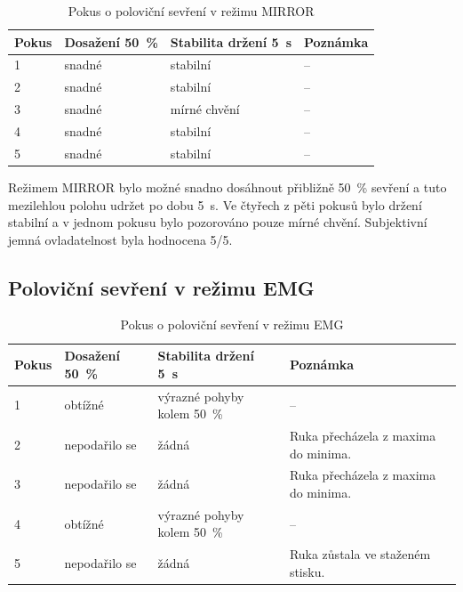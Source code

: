 \documentclass[FZS,DP]{tulthesis}
\begin{document}
\begin{table}[H]
\centering
\caption{Pokus o poloviční sevření v režimu MIRROR}
\label{tab:mirror-polovicni-sevreni}
\setlength{\tabcolsep}{2pt}
\begin{tabular}{|p{}|p{}|p{}|p{}|}
\hline
\textbf{Pokus} & \textbf{Dosažení 50~\%} & \textbf{Stabilita držení 5~s} & \textbf{Poznámka} \\
\hline
1 & snadné & stabilní & -- \\
\hline
2 & snadné & stabilní & -- \\
\hline
3 & snadné & mírné chvění & -- \\
\hline
4 & snadné & stabilní & -- \\
\hline
5 & snadné & stabilní & -- \\
\hline
\end{tabular}
\end{table}

Režimem MIRROR bylo možné snadno dosáhnout přibližně 50~\% sevření a tuto mezilehlou polohu udržet po dobu 5~s. Ve čtyřech z pěti pokusů bylo držení stabilní a v jednom pokusu bylo pozorováno pouze mírné chvění. Subjektivní jemná ovladatelnost byla hodnocena 5/5.

\subsection{Poloviční sevření v režimu EMG}
\label{subsec:polovicni-emg}

\begin{table}[H]
\centering
\caption{Pokus o poloviční sevření v režimu EMG}
\label{tab:emg-polovicni-sevreni}
\setlength{\tabcolsep}{2pt}
\begin{tabular}{|p{}|p{}|p{}|p{}|}
\hline
\textbf{Pokus} & \textbf{Dosažení 50~\%} & \textbf{Stabilita držení 5~s} & \textbf{Poznámka} \\
\hline
1 & obtížné & výrazné pohyby kolem 50~\% & -- \\
\hline
2 & nepodařilo se & žádná & Ruka přecházela z maxima do minima. \\
\hline
3 & nepodařilo se & žádná & Ruka přecházela z maxima do minima. \\
\hline
4 & obtížné & výrazné pohyby kolem 50~\% & -- \\
\hline
5 & nepodařilo se & žádná & Ruka zůstala ve staženém stisku. \\
\hline
\end{tabular}
\end{table}
\end{document}
